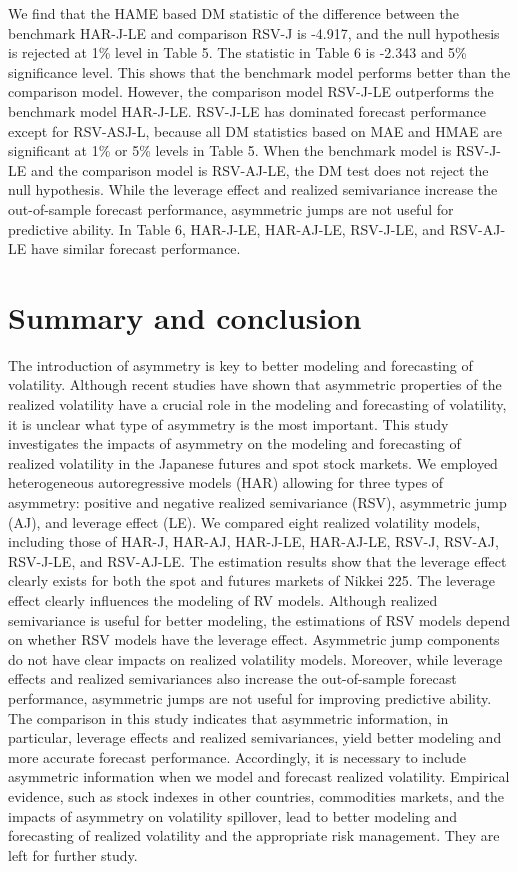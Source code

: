 \documentclass[10pt]{article}
\begin{document}
We find that the HAME based DM statistic of the difference between the benchmark HAR-J-LE and comparison RSV-J is -4.917, and the null hypothesis is rejected at 1\% level in Table 5. 
The statistic in Table 6 is -2.343 and 5\% significance level. 
This shows that the benchmark model performs better than the comparison model. 
However, the comparison model RSV-J-LE outperforms the benchmark model HAR-J-LE. 
RSV-J-LE has dominated forecast performance except for RSV-ASJ-L, because all DM statistics based on MAE and HMAE are significant at 1\% or 5\% levels in Table 5. 
When the benchmark model is RSV-J-LE and the comparison model is RSV-AJ-LE, the DM test does not reject the null hypothesis. 
While the leverage effect and realized semivariance increase the out-of-sample forecast performance,    
asymmetric jumps are not useful for predictive ability. 
In Table 6, HAR-J-LE, HAR-AJ-LE, RSV-J-LE, and RSV-AJ-LE have similar forecast performance. 


\section{Summary and conclusion}
The introduction of asymmetry is key to better modeling and forecasting of volatility. 
Although recent studies have shown that asymmetric properties of the realized volatility have a crucial role in the modeling and forecasting of volatility, 
it is unclear what type of asymmetry is the most important.  
This study investigates the impacts of asymmetry on the modeling and forecasting of realized volatility in the Japanese futures and spot stock markets. 
We employed heterogeneous autoregressive models (HAR) allowing for three types of asymmetry: 
positive and negative realized semivariance (RSV), asymmetric jump (AJ), and leverage effect (LE). 
We compared eight realized volatility models, including those of HAR-J, HAR-AJ, HAR-J-LE, HAR-AJ-LE, RSV-J, RSV-AJ, RSV-J-LE, and RSV-AJ-LE. 
The estimation results show that the leverage effect clearly exists for both the spot and futures markets of Nikkei 225. 
The leverage effect clearly influences the modeling of RV models. 
Although realized semivariance is useful for better modeling,   
the estimations of RSV models depend on whether RSV models have the leverage effect. 
Asymmetric jump components do not have clear impacts on realized volatility models.  
Moreover, while leverage effects and realized semivariances also increase the out-of-sample forecast performance,    
asymmetric jumps are not useful for improving predictive ability. 
The comparison in this study indicates that asymmetric information, in particular, leverage effects and realized semivariances, yield better modeling and more accurate forecast performance. 
Accordingly, it is necessary to include asymmetric information when we model and forecast realized volatility. 
Empirical evidence, such as stock indexes in other countries, commodities markets, and the impacts of asymmetry on volatility spillover, lead to better modeling and forecasting of realized volatility 
and the appropriate risk management. 
They are left for further study.  
\end{document}
